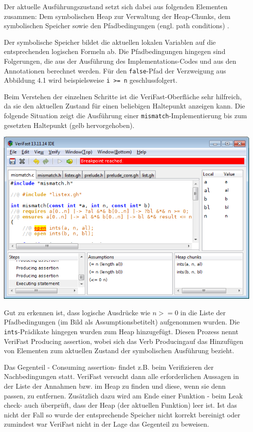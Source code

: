Der aktuelle Ausführungszustand setzt sich dabei aus folgenden Elementen zusammen: 
Dem symbolischen Heap zur Verwaltung der Heap-Chunks, dem symbolischen Speicher sowie den Pfadbedingungen
(engl. path conditions) \cite[Kap. 2]{jacobs-2010}. 

Der symbolische Speicher bildet die aktuellen lokalen Variablen auf die entsprechenden logischen Formeln ab.
Die Pfadbedingungen hingegen sind Folgerungen, die aus der Ausführung des Implementations-Codes und aus den Annotationen
berechnet werden. Für den \texttt{false}-Pfad der Verzweigung aus Abbildung 4.1 wird beispielsweise
\lstinline{i >= n} geschlussfolgert.

Beim Verstehen der einzelnen Schritte ist die VeriFast-Oberfläche sehr hilfreich, da sie den aktuellen
Zustand für einen beliebigen Haltepunkt anzeigen kann. Die folgende Situation zeigt die Ausführung
einer \lstinline{mismatch}-Implementierung bis zum gesetzten Haltepunkt (gelb hervorgehoben).

\begin{center}
\includegraphics[width=1.0\textwidth]{images/VeriFast-state-after-precondition.png}
\end{center}

Gut zu erkennen ist, dass logische Ausdrücke wie \(n >= 0\) in die Liste der Pfadbedingungen 
(im Bild als \glqq Assumptions\grqq betitelt) aufgenommen wurden. Die \lstinline{ints}-Prädikate hingegen
wurden zum Heap hinzugefügt. Diesen Prozess nennt VeriFast \glqq Producing assertion\grqq, wobei sich das Verb
\glqq Producing\grqq auf das Hinzufügen von Elementen zum aktuellen Zustand der symbolischen Ausführung
bezieht.

Das Gegenteil - \glqq Consuming assertion\grqq - findet z.B. beim Verifizieren der Nachbedingungen statt.
VeriFast versucht dann alle erforderlichen Aussagen in der Liste der Annahmen bzw. im Heap zu finden
und diese, wenn sie denn passen, zu entfernen. Zusätzlich dazu wird am Ende einer Funktion - beim 
\glqq Leak check\grqq - auch überprüft, dass der Heap (der aktuellen Funktion) leer ist. Ist das nicht 
der Fall so wurde der entsprechende Speicher nicht korrekt bereinigt oder zumindest war VeriFast nicht 
in der Lage das Gegenteil zu beweisen.

